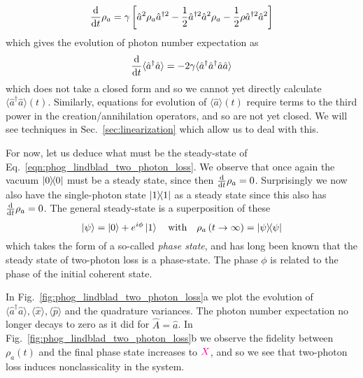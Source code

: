 \begin{equation}\label{eqn:phog_lindblad_two_photon_loss}
\frac{\mathrm{d}}{\mathrm{d}t} \rho_a = \gamma\left[\hat{a}^2 \rho_a \hat{a}^{\dagger 2} - \frac{1}{2} \hat{a}^{\dagger 2} \hat{a}^2 \rho_a - \frac{1}{2} \rho \hat{a}^{\dagger 2} \hat{a}^2\right]
\end{equation}
which gives the evolution of photon number expectation as 
\begin{equation}
\frac{\mathrm{d}}{\mathrm{d}t} \langle \hat{a}^\dagger \hat{a}\rangle = - 2 \gamma \langle \hat{a}^\dagger \hat{a}^\dagger \hat{a}\hat{a}\rangle
\end{equation}
which does not take a closed form and so we cannot yet directly calculate $\langle \hat{a}^\dagger \hat{a}\rangle\left(t\right)$. Similarly, equations for evolution of $\langle\hat{a}\rangle\left(t\right)$ require terms to the third power in the creation/annihilation operators, and so are not yet closed.  We will see techniques in Sec.~\ref{sec:linearization} which allow us to deal with this.

For now, let us deduce what must be the steady-state of Eq.~\ref{eqn:phog_lindblad_two_photon_loss}. We observe that once again the vacuum $\dyad{0}$ must be a steady state, since then $\frac{\mathrm{d}}{\mathrm{d}t} \rho_a=0$. Surprisingly we now also have the single-photon state $\dyad{1}$ as a steady state since this also has $\frac{\mathrm{d}}{\mathrm{d}t} \rho_a=0$. The general steady-state is a superposition of these
\begin{equation}\label{eqn:phog_phase_state}
\ket{\psi} = \ket{0} + e^{i \phi} \ket{1} \qq{with} \rho_a\left(t \rightarrow \infty\right) = \dyad{\psi}
\end{equation}
which takes the form of a so-called \emph{phase state}, and has long been known that the steady state of two-photon loss is a phase-state. The phase $\phi$ is related to the phase of the initial coherent state. %


In Fig.~\ref{fig:phog_lindblad_two_photon_loss}a we plot the evolution of $\langle \hat{a}^\dagger \hat{a}\rangle, \langle \hat{x}\rangle, \langle \hat{p}\rangle$ and the quadrature variances. The photon number expectation no longer decays to zero as it did for $\hat{A}=\hat{a}$. In Fig.~\ref{fig:phog_lindblad_two_photon_loss}b we observe the fidelity between $\rho_a\left(t\right)$ and the final phase state increases to $\textcolor{magenta}{X}$, and so we see that two-photon loss induces nonclassicality in the system. 


